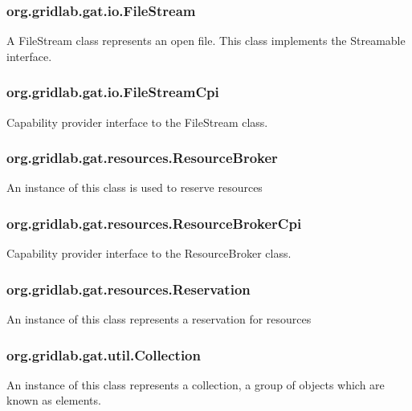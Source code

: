 \documentclass[$Date: 2003/06/26 19:29:31 $]{glabarticle}
\begin{document}
\subsubsection{org.gridlab.gat.io.FileStream}

A FileStream class represents an open file.  This class implements the Streamable interface.

\subsubsection{org.gridlab.gat.io.FileStreamCpi}

Capability provider interface to the FileStream class.

\subsubsection{org.gridlab.gat.resources.ResourceBroker}

An instance of this class is used to reserve resources

\subsubsection{org.gridlab.gat.resources.ResourceBrokerCpi}

Capability provider interface to the ResourceBroker class.

\subsubsection{org.gridlab.gat.resources.Reservation}

An instance of this class represents a reservation for resources

\subsubsection{org.gridlab.gat.util.Collection}

An instance of this class represents a collection, a group of objects which are known as elements.
\end{document}
